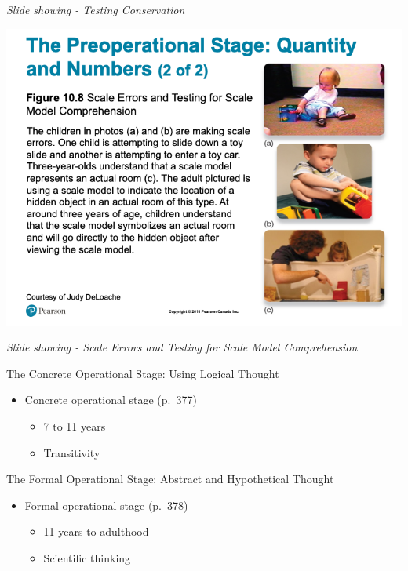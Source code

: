 \documentclass[
]{book}
\providecommand{\tightlist}{%
  \setlength{\itemsep}{0pt}\setlength{\parskip}{0pt}}
\begin{document}
\begin{reflect}
\emph{Slide showing - Testing Conservation}

\includegraphics{assets/unit_3/slide_26.png}

\emph{Slide showing - Scale Errors and Testing for Scale Model Comprehension}

The Concrete Operational Stage: Using Logical Thought

\begin{itemize}
\tightlist
\item
  Concrete operational stage (p.~377)

  \begin{itemize}
  \tightlist
  \item
    7 to 11 years\\
  \item
    Transitivity
  \end{itemize}
\end{itemize}

The Formal Operational Stage: Abstract and Hypothetical Thought

\begin{itemize}
\tightlist
\item
  Formal operational stage (p.~378)

  \begin{itemize}
  \tightlist
  \item
    11 years to adulthood\\
  \item
    Scientific thinking
  \end{itemize}
\end{itemize}


\end{reflect}
\end{document}
